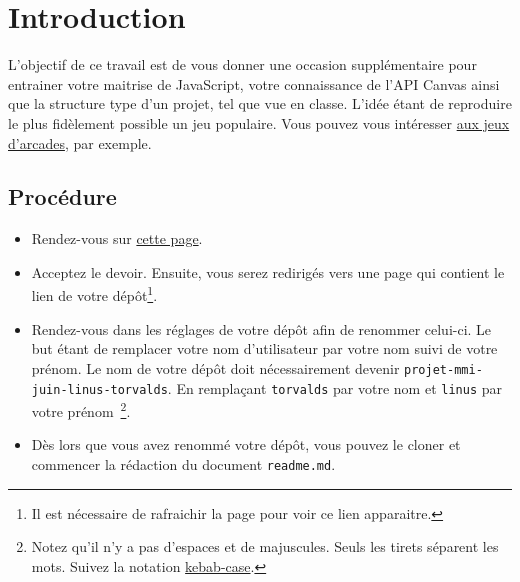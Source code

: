 \pagestyle{mypagestyle}

\maketitle

\section{Introduction}

L’objectif de ce travail est de vous donner une occasion supplémentaire pour entrainer votre maitrise de JavaScript, votre connaissance de l'API Canvas ainsi que la structure type d'un projet, tel que vue en classe. L'idée étant de reproduire le plus fidèlement possible un jeu populaire. Vous pouvez vous intéresser \href{https://archive.org/details/internetarcade}{aux jeux d'arcades}, par exemple.

\subsection{Procédure}
\label{procedure}

\begin{itemize}
  \item Rendez-vous sur \href{https://classroom.github.com/a/xBzM63w9}{cette page}.
  \item Acceptez le devoir. Ensuite, vous serez redirigés vers une page qui contient le lien de votre dépôt\footnote{Il est nécessaire de rafraichir la page pour voir ce lien apparaitre.}.
  \item Rendez-vous dans les réglages de votre dépôt afin de renommer celui-ci. Le but étant de remplacer votre nom d'utilisateur par votre nom suivi de votre prénom. Le nom de votre dépôt doit nécessairement devenir \verb!projet-mmi-juin-linus-torvalds!. En remplaçant \verb!torvalds! par votre nom et \verb!linus! par votre prénom~\footnote{Notez qu’il n'y a pas d'espaces et de majuscules. Seuls les tirets séparent les mots. Suivez la notation \href{https://en.wiktionary.org/wiki/kebab_case}{kebab-case}.}.
  \item Dès lors que vous avez renommé votre dépôt, vous pouvez le cloner et commencer la rédaction du document \verb!readme.md!.
\end{itemize}
\vspace*{2cm}
\begin{figure}[htbp]
  \centering
  
\end{figure}

